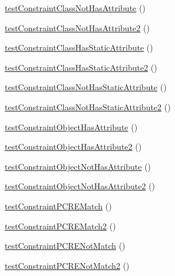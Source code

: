 \begin{DoxyCompactItemize}
\item 
\mbox{\hyperlink{class_framework___constraint_test_a1e6712b0a168cbca8fa03ba12cb0531d}{test\+Constraint\+Class\+Not\+Has\+Attribute}} ()
\item 
\mbox{\hyperlink{class_framework___constraint_test_a54966651ba10e1826ac0c52d2adc2459}{test\+Constraint\+Class\+Not\+Has\+Attribute2}} ()
\item 
\mbox{\hyperlink{class_framework___constraint_test_ae16d859e001c9393aaa3b3b5cbd42e64}{test\+Constraint\+Class\+Has\+Static\+Attribute}} ()
\item 
\mbox{\hyperlink{class_framework___constraint_test_a426687d7dfef557a3cf677e85d14e825}{test\+Constraint\+Class\+Has\+Static\+Attribute2}} ()
\item 
\mbox{\hyperlink{class_framework___constraint_test_a90d5baf39647c7cd132a158ae09e2e2f}{test\+Constraint\+Class\+Not\+Has\+Static\+Attribute}} ()
\item 
\mbox{\hyperlink{class_framework___constraint_test_af15e885478ac135bd859daa812b2129f}{test\+Constraint\+Class\+Not\+Has\+Static\+Attribute2}} ()
\item 
\mbox{\hyperlink{class_framework___constraint_test_aeba849c2bd519407708f9965d9a5ffbe}{test\+Constraint\+Object\+Has\+Attribute}} ()
\item 
\mbox{\hyperlink{class_framework___constraint_test_a29e4d68d3921b4a6cf1f7377241c4926}{test\+Constraint\+Object\+Has\+Attribute2}} ()
\item 
\mbox{\hyperlink{class_framework___constraint_test_a15b8601ed5ad77952ae576a8e9cf091d}{test\+Constraint\+Object\+Not\+Has\+Attribute}} ()
\item 
\mbox{\hyperlink{class_framework___constraint_test_a757b20b50dac061dd34ebfe159981634}{test\+Constraint\+Object\+Not\+Has\+Attribute2}} ()
\item 
\mbox{\hyperlink{class_framework___constraint_test_a463bbfa53e2d2f2e6b50ad5072793a91}{test\+Constraint\+P\+C\+R\+E\+Match}} ()
\item 
\mbox{\hyperlink{class_framework___constraint_test_a7f7841598a737832ac3f9e7c4e157fcd}{test\+Constraint\+P\+C\+R\+E\+Match2}} ()
\item 
\mbox{\hyperlink{class_framework___constraint_test_aba1cbc34b7ada5eed40cf9d8369aee06}{test\+Constraint\+P\+C\+R\+E\+Not\+Match}} ()
\item 
\mbox{\hyperlink{class_framework___constraint_test_ace1ec3fecd2e7822b2f17293313a62c7}{test\+Constraint\+P\+C\+R\+E\+Not\+Match2}} ()
\item 

\end{DoxyCompactItemize}
